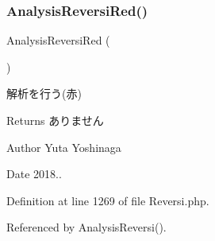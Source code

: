 \subsubsection{\texorpdfstring{Analysis\+Reversi\+Red()}{AnalysisReversiRed()}}
{\footnotesize\ttfamily Analysis\+Reversi\+Red (\begin{DoxyParamCaption}{ }\end{DoxyParamCaption})\hspace{0.3cm}{\ttfamily [private]}}



解析を行う(赤) 

\begin{DoxyReturn}{Returns}
ありません 
\end{DoxyReturn}
\begin{DoxyAuthor}{Author}
Yuta Yoshinaga 
\end{DoxyAuthor}
\begin{DoxyDate}{Date}
2018.. 
\end{DoxyDate}


Definition at line 1269 of file Reversi.\+php.



Referenced by Analysis\+Reversi().

